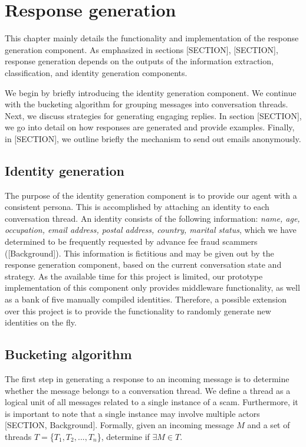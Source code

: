 \chapter{Response generation}

This chapter mainly details the functionality and implementation of the response generation component. As emphasized in sections [SECTION], [SECTION], response generation depends on the outputs of the information extraction, classification, and identity generation components. 

We begin by briefly introducing the identity generation component. We continue with the bucketing algorithm for grouping messages into conversation threads. Next, we discuss strategies for generating engaging replies. In section [SECTION], we go into detail on how responses are generated and provide examples. Finally, in [SECTION], we outline briefly the mechanism to send out emails anonymously.

\section{Identity generation}
The purpose of the identity generation component is to provide our agent with a consistent persona. This is accomplished by attaching an identity to each conversation thread. An identity consists of the following information: \textit{name, age, occupation, email address, postal address, country, marital status}, which we have determined to be frequently requested by advance fee fraud scammers ([Background]). This information is fictitious and may be given out by the response generation component, based on the current conversation state and strategy. As the available time for this project is limited, our prototype implementation of this component only provides middleware functionality, as well as a bank of five manually compiled identities. Therefore, a possible extension over this project is to provide the functionality to randomly generate new identities on the fly.

\section{Bucketing algorithm}
The first step in generating a response to an incoming message is to determine whether the message belongs to a conversation thread. We define a thread as a logical unit of all messages related to a single instance of a scam. Furthermore, it is important to note that a single instance may involve multiple actors [SECTION, Background]. Formally, given an incoming message $M$ and a set of threads $T = $\{$T_{1}, T_{2}, ..., T_{n}$\}, determine if $\exists M \in T$.
	
